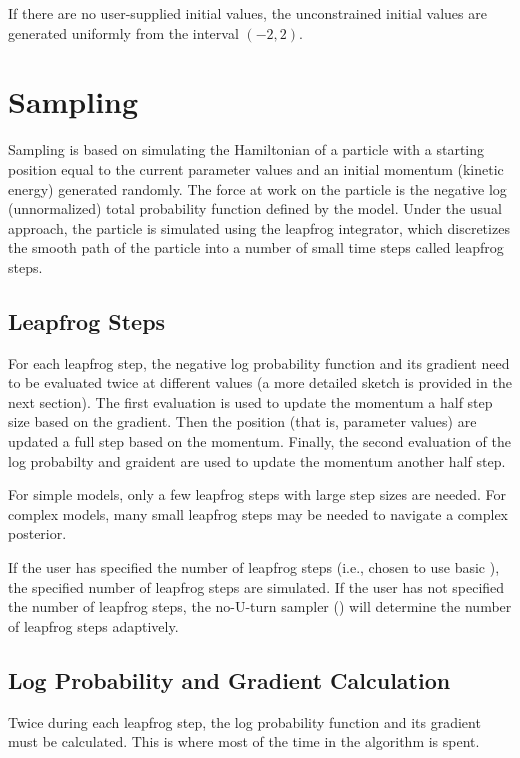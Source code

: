 If there are no user-supplied initial values, the unconstrained
initial values are generated uniformly from the interval $(-2,2)$.

\section{Sampling}

Sampling is based on simulating the Hamiltonian of a particle with a
starting position equal to the current parameter values and an initial
momentum (kinetic energy) generated randomly.  The force at work on
the particle is the negative log (unnormalized) total probability
function defined by the model.  Under the usual \HMC approach, the
particle is simulated using the leapfrog integrator, which discretizes
the smooth path of the particle into a number of small time steps called
leapfrog steps.

\subsection{Leapfrog Steps}

For each leapfrog step, the negative log probability function and its
gradient need to be evaluated twice at different values (a more
detailed sketch is provided in the next section).  The first
evaluation is used to update the momentum a half step size based on
the gradient.  Then the position (that is, parameter values) are
updated a full step based on the momentum.  Finally, the second
evaluation of the log probabilty and graident are used to update the
momentum another half step.

For simple models, only a few leapfrog steps with large step sizes are
needed.  For complex models, many small leapfrog steps may be needed
to navigate a complex posterior.

If the user has specified the number of leapfrog steps (i.e., chosen
to use basic \HMC), the specified number of leapfrog steps are
simulated.  If the user has not specified the number of leapfrog
steps, the no-U-turn sampler (\NUTS) will determine the number of
leapfrog steps adaptively.

\subsection{Log Probability and Gradient Calculation}

Twice during each leapfrog step, the log probability function and its
gradient must be calculated.  This is where most of the time in the
\Stan algorithm is spent.

